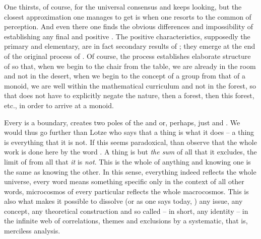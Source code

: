 \pa One thirsts, of course, for the universal consensus and keeps looking, but the
closest approximation one manages to get is when one resorts to the common
 of perception. And even there one finds the obvious differences and
impossibility of establishing any final and positive .
The positive characteristics, supposedly the primary and elementary, are in fact
secondary results of ; they emerge at the end of the
original process of . Of course, the
process establishes elaborate structure of  so that, when we
begin to  the chair from the table, we are already in the room
and not in the desert, when we begin to  the concept of a group
from that of a monoid, we are well within the mathematical curriculum and not in
the forest, so that  does not have to explicitly negate the nature,
then a forest, then this forest, etc., in order to arrive at a monoid.

Every  is a boundary, creates two poles of the  and
 or, perhaps, just  and . We would thus go
further than Lotze who says that a thing is what it does -- a thing is
everything that it is not. If this seems paradoxical, than observe that the
whole work is done here by the word . A thing is but {\em the
  sum} of all that it excludes, the limit of  from all that
{\em it} is {\em not}. This is the whole  of anything and
knowing one is the same as knowing the other. In this sense, everything indeed
reflects the whole universe, every word means something specific only in the
context of all other words, microcosmos of every particular reflects the whole
macrocosmos.  This is also what makes it possible to dissolve (or as one says
today, ) any issue, any concept, any theoretical construction
and so called  -- in short, any identity -- in the infinite
web of correlations, themes and exclusions by a systematic, that is, merciless
analysis.

